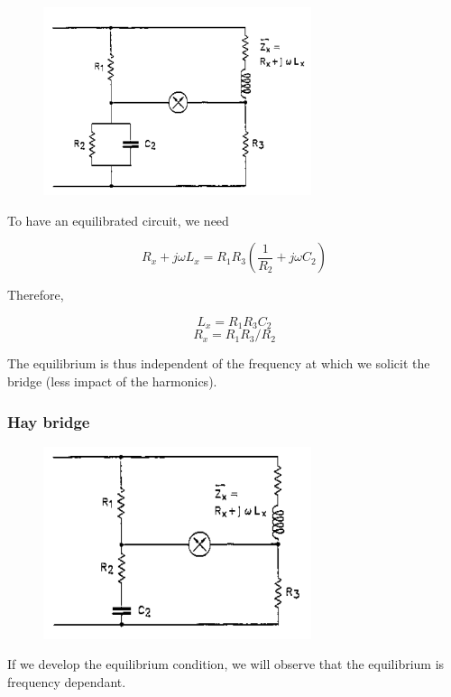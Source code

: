 \begin{minipage}[c]{0.45 \linewidth}
\begin{figure}[H]
    \centering
    \includegraphics[width = 0.7\textwidth]{L4/img/maxwell-bridge.PNG}
\end{figure}
\end{minipage}\hfill
\begin{minipage}[c]{0.45 \linewidth}
To have an equilibrated circuit, we need

$$ R_x + j\omega L_x = R_1 R_3 \left(\frac{1}{R_2} + j \omega C_2\right) $$

Therefore,

$$ L_x = R_1 R_3 C_2 $$
$$ R_x = R_1 R_3/R_2 $$

The equilibrium is thus independent of the frequency at which we solicit the bridge (less impact of the harmonics).
\end{minipage}


\subsubsection{Hay bridge}

\begin{minipage}[c]{0.45 \linewidth}
\begin{figure}[H]
    \centering
    \includegraphics[width = 0.7\textwidth]{L4/img/hay-bridge.PNG}
\end{figure}
\end{minipage}\hfill
\begin{minipage}[c]{0.45 \linewidth}
    If we develop the equilibrium condition, we will observe that the equilibrium is frequency dependant.
\end{minipage}

